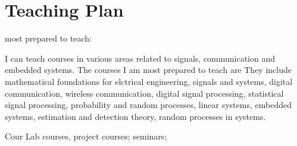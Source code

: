 \documentclass[10pt]{article}
\begin{document}
\section{Teaching Plan}
most prepared to teach:

I can teach courses in various areas related to signals, communication and embedded systems. The courses I am most prepared to teach are They include mathematical foundations for elctrical engineering, signals and systems, digital communication, wireless communication, digital signal processing, statistical signal processing, probability and random processes, linear systems, embedded systems, estimation and detection theory, random processes in systems. 

Cour
Lab courses, project courses;
seminars;





\end{document}
